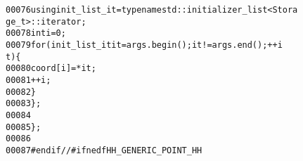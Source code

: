 \begin{footnotesize}
\begin{alltt}
00076                         \textcolor{keyword}{using} init\_list\_it = \textcolor{keyword}{typename} std::initializer\_list<Stora
      ge\_t>::iterator;
00078                         \textcolor{keywordtype}{int} i=0;
00079                         \textcolor{keywordflow}{for}(init\_list\_it it = args.begin(); it != args.end(); ++i
      t)\{
00080                                 coord[i] = *it;
00081                                 ++i;
00082                         \}                       
00083                 \};
00084                 
00085 \};
00086 
00087 \textcolor{preprocessor}{#endif // #ifnedf HH\_GENERIC\_POINT\_HH}
\end{alltt}\end{footnotesize}

